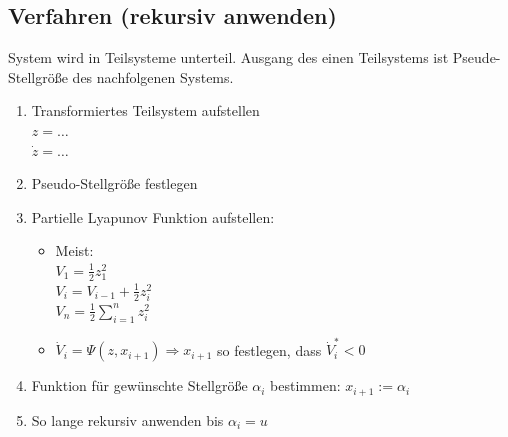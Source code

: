 \documentclass[german]{latex4ei/latex4ei_sheet}
\begin{document}
\begin{sectionbox}
\subsection{Verfahren (rekursiv anwenden)}

System wird in Teilsysteme unterteil. Ausgang des einen Teilsystems ist Pseude-Stellgröße des nachfolgenen Systems.

\begin{enumerate}
  \item Transformiertes Teilsystem aufstellen\\
    $z = \dots$\\
    $\dot{z} = \dots$
  \item Pseudo-Stellgröße festlegen
  \item Partielle Lyapunov Funktion aufstellen:
    \begin{itemize}
      \item  Meist:\\
        $V_1 = \frac{1}{2} z_1^2$\\
        $V_i = V_{i-1} + \frac{1}{2}z_i^2$ \\
        $V_n = \frac{1}{2} \sum\limits_{i=1}^{n} z_i^2$
      \item $\dot{V}_i = \Psi(z, x_{i+1}) \Rightarrow x_{i+1}$ so festlegen, dass $\dot{V}_i^* < 0$
    \end{itemize}
  \item Funktion für gewünschte Stellgröße $\alpha_i$ bestimmen: $x_{i+1} := \alpha_i$
  \item So lange rekursiv anwenden bis $\alpha_i = u$
\end{enumerate}
\end{sectionbox}
\end{document}

